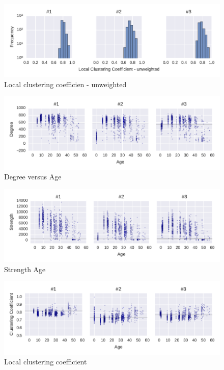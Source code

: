 \begin{figure}[htb]
	\centering
	\includegraphics[width=1.0\textwidth]{Figures/stat-lccDist}
	\caption[Local clustering coefficien]{Local clustering coefficien - unweighted}
	\label{fig:lccDist}
\end{figure}


\begin{figure}[htb]
	\centering
	\includegraphics[width=1.0\textwidth]{Figures/stat-degreeAge}
	\caption[Degree VS Age]{Degree versus Age}
	\label{fig:degreeAge}
\end{figure}


\begin{figure}[htb]
	\centering
	\includegraphics[width=1.0\textwidth]{Figures/stat-strengthAge}
	\caption[Strength Age]{Strength Age}
	\label{fig:strengthAge}
\end{figure}	


\begin{figure}[htb]
	\centering
	\includegraphics[width=1.0\textwidth]{Figures/stat-ccAge}
	\caption[Local clustering coefficient]{Local clustering coefficient}
	\label{fig:ccAge}
\end{figure}
